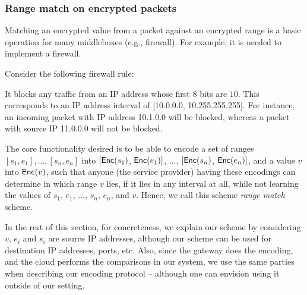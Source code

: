 


\subsubsection{Range match on encrypted packets} \label{sec:range}

Matching an encrypted value from a packet against an encrypted range is a basic operation for many middleboxes (e.g., firewall). 
For example, it is needed to implement a firewall. 

 Consider the following firewall rule:

\smallskip
{}


\noindent It blocks any traffic from an IP address whose first 8 bits are $10$. This corresponds to an IP address interval of 
[10.0.0.0, 10.255.255.255].
For instance, an incoming packet with IP address 10.1.0.0 will be blocked, whereas a packet with source IP 11.0.0.0 will not be blocked.


The core functionality desired is to be able to encode a set of ranges $[s_1, e_1], \dots, [s_n, e_n]$ into  $[\mathsf{Enc}(s_1)$, $\mathsf{Enc}(e_1)]$, $\dots$, $[\mathsf{Enc}(s_n)$,  $\mathsf{Enc}(e_n)]$, and a value $v$ into $\mathsf{Enc}(v)$, such that anyone (the service provider) having these encodings can determine in which range $v$ lies, if it lies in any interval at all, while not learning the values of $s_1$, $e_1$, $\dots$, $s_n$, $e_n$, and $v$. Hence, we call this scheme {\em range match} scheme. 

In the rest of this section, for concreteness, we explain our scheme by considering $v$, $e_i$ and $s_i$ are source IP addresses, although our scheme can be used for destination IP addresses, ports, etc. Also, since the gateway does the encoding, and the cloud performs the comparisons in our system, we use the same parties when describing our encoding protocol -- although one can envision using it outside of our setting. 

